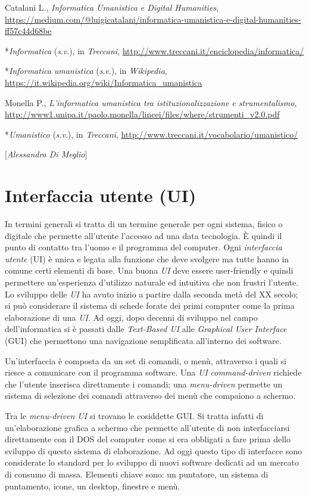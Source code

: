 {{Catalani L., \emph{Informatica Umanistica e Digital Humanities},
\url{https://medium.com/@luigicatalani/informatica-umanistica-e-digital-humanities-ff57c44d68be}

*\emph{Informatica} (\emph{s}.\emph{v}.), in \emph{Treccani},
\url{http://www.treccani.it/enciclopedia/informatica/}

*\emph{Informatica} \emph{umanistica} (\emph{s}.\emph{v}.), in
\emph{Wikipedia},
\url{https://it.wikipedia.org/wiki/Informatica\_umanistica}

Monella P., \emph{L'informatica umanistica tra istituzionalizzazione e
strumentalismo},
\url{http://www1.unipa.it/paolo.monella/lincei/files/where/strumenti_v2.0.pdf}

*\emph{Umanistico} (\emph{s}.\emph{v}.), in \emph{Treccani},
\url{http://www.treccani.it/vocabolario/umanistico/}
}

\hrulefill 

{[}\emph{Alessandra Di Meglio}{]}

\chapter{Interfaccia utente (UI)}

In termini generali si tratta di un termine generale per ogni sistema,
fisico o digitale che permette all'utente l'accesso ad una data
tecnologia. È quindi il punto di contatto tra l'uomo e il programma del
computer. Ogni \emph{interfaccia utente} (UI) è unica e legata alla
funzione che deve svolgere ma tutte hanno in comune certi elementi di
base. Una buona \emph{UI} deve essere user-friendly e quindi permettere
un'esperienza d'utilizzo naturale ed intuitiva che non frustri l'utente.
Lo sviluppo delle \emph{UI} ha avuto inizio a partire dalla seconda metà
del XX secolo; si può considerare il sistema di schede forate dei primi
computer come la prima elaborazione di una \emph{UI}. Ad oggi, dopo
decenni di sviluppo nel campo dell'informatica si è passati dalle
\emph{Text-Based UI} alle \emph{Graphical User Interface} (GUI) che
permettono una navigazione semplificata all'interno dei software.

Un'interfaccia è composta da un set di comandi, o menù, attraverso i
quali si riesce a comunicare con il programma software. Una \emph{UI}
\emph{command-driven} richiede che l'utente inserisca direttamente i
comandi; una \emph{menu-driven} permette un sistema di selezione dei
comandi attraverso dei menù che compaiono a schermo.

Tra le \emph{menu-driven UI} si trovano le cosiddette GUI. Si tratta
infatti di un'elaborazione grafica a schermo che permette all'utente di
non interfacciarsi direttamente con il DOS del computer come si era
obbligati a fare prima dello sviluppo di questo sistema di elaborazione.
Ad oggi questo tipo di interfacce sono considerate lo standard per lo
sviluppo di nuovi software dedicati ad un mercato di consumo di massa.
Elementi chiave sono: un puntatore, un sistema di puntamento, icone, un
desktop, finestre e menù.

}
